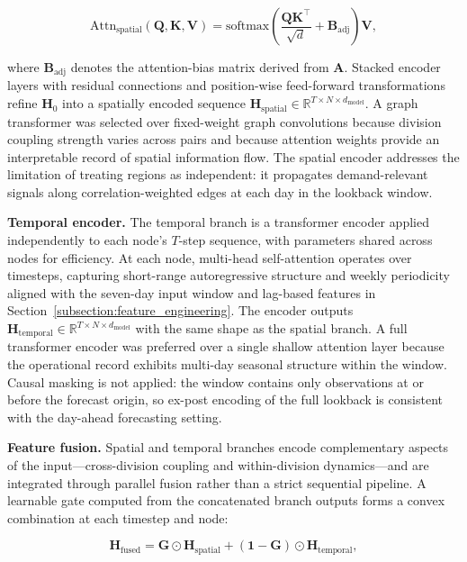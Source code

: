 \[
\mathrm{Attn}_{\mathrm{spatial}}(\mathbf{Q}, \mathbf{K}, \mathbf{V}) = \mathrm{softmax}\!\left(\frac{\mathbf{Q}\mathbf{K}^\top}{\sqrt{d}} + \mathbf{B}_{\mathrm{adj}}\right)\mathbf{V},
\]

where \(\mathbf{B}_{\mathrm{adj}}\) denotes the attention-bias matrix derived from \(\mathbf{A}\). Stacked encoder layers with residual connections and position-wise feed-forward transformations refine \(\mathbf{H}_0\) into a spatially encoded sequence \(\mathbf{H}_{\mathrm{spatial}} \in \mathbb{R}^{T \times N \times d_{\mathrm{model}}}\). A graph transformer was selected over fixed-weight graph convolutions because division coupling strength varies across pairs and because attention weights provide an interpretable record of spatial information flow. The spatial encoder addresses the limitation of treating regions as independent: it propagates demand-relevant signals along correlation-weighted edges at each day in the lookback window.

\textbf{Temporal encoder.} The temporal branch is a transformer encoder \cite{Vaswani2017Attention} applied independently to each node's \(T\)-step sequence, with parameters shared across nodes for efficiency. At each node, multi-head self-attention operates over timesteps, capturing short-range autoregressive structure and weekly periodicity aligned with the seven-day input window and lag-based features in Section~\ref{subsection:feature_engineering}. The encoder outputs \(\mathbf{H}_{\mathrm{temporal}} \in \mathbb{R}^{T \times N \times d_{\mathrm{model}}}\) with the same shape as the spatial branch. A full transformer encoder was preferred over a single shallow attention layer because the operational record exhibits multi-day seasonal structure within the window. Causal masking is not applied: the window contains only observations at or before the forecast origin, so ex-post encoding of the full lookback is consistent with the day-ahead forecasting setting.

\textbf{Feature fusion.} Spatial and temporal branches encode complementary aspects of the input---cross-division coupling and within-division dynamics---and are integrated through parallel fusion rather than a strict sequential pipeline. A learnable gate computed from the concatenated branch outputs forms a convex combination at each timestep and node:

\[
\mathbf{H}_{\mathrm{fused}} = \mathbf{G} \odot \mathbf{H}_{\mathrm{spatial}} + (\mathbf{1} - \mathbf{G}) \odot \mathbf{H}_{\mathrm{temporal}},
\]

